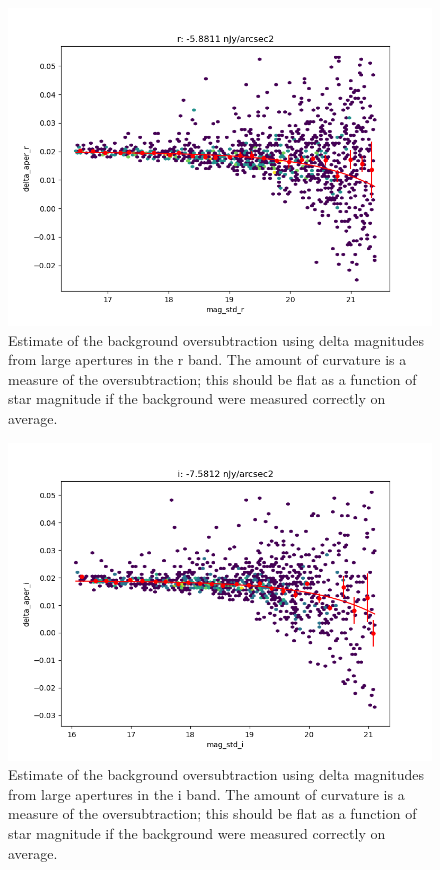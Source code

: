\begin{figure}
  \includegraphics{photometric_calibration_figures/background_oversubtraction_r.png}
  \caption{Estimate of the background oversubtraction using delta magnitudes
    from large apertures in the r band.  The amount of curvature is a measure
    of the oversubtraction; this should be flat as a function of star magnitude
    if the background were measured correctly on average.}
\end{figure}

\begin{figure}
  \includegraphics{photometric_calibration_figures/background_oversubtraction_i.png}
  \caption{Estimate of the background oversubtraction using delta magnitudes
    from large apertures in the i band.  The amount of curvature is a measure
    of the oversubtraction; this should be flat as a function of star magnitude
    if the background were measured correctly on average.}
\end{figure}

